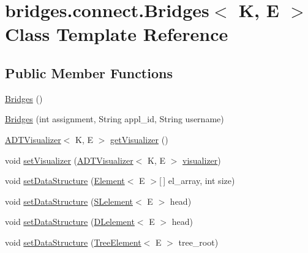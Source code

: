 \hypertarget{classbridges_1_1connect_1_1_bridges}{}\section{bridges.\+connect.\+Bridges$<$ K, E $>$ Class Template Reference}
\label{classbridges_1_1connect_1_1_bridges}
\subsection*{Public Member Functions}
\begin{DoxyCompactItemize}
\item 
\hyperlink{classbridges_1_1connect_1_1_bridges_a4925cf146eff9ff84e89351ab574795d}{Bridges} ()
\item 
\hyperlink{classbridges_1_1connect_1_1_bridges_a297e7ca95c725fa20bce0768c2d9aa64}{Bridges} (int assignment, String appl\+\_\+id, String username)
\item 
\hyperlink{classbridges_1_1base_1_1_a_d_t_visualizer}{A\+D\+T\+Visualizer}$<$ K, E $>$ \hyperlink{classbridges_1_1connect_1_1_bridges_a7193b48c9dc01b04dfcf0d66fa2f59fb}{get\+Visualizer} ()
\item 
void \hyperlink{classbridges_1_1connect_1_1_bridges_ad627f604914734646e92fac9e7b385d8}{set\+Visualizer} (\hyperlink{classbridges_1_1base_1_1_a_d_t_visualizer}{A\+D\+T\+Visualizer}$<$ K, E $>$ \hyperlink{classbridges_1_1connect_1_1_bridges_af3fc35779b31c976ed8bf2e173310502}{visualizer})
\item 
void \hyperlink{classbridges_1_1connect_1_1_bridges_a0cc12a419997a8ef0ef54afe9e65d1e9}{set\+Data\+Structure} (\hyperlink{classbridges_1_1base_1_1_element}{Element}$<$ E $>$\mbox{[}$\,$\mbox{]} el\+\_\+array, int size)
\item 
void \hyperlink{classbridges_1_1connect_1_1_bridges_ae41b3d86963350ace304d8951c1863ad}{set\+Data\+Structure} (\hyperlink{classbridges_1_1base_1_1_s_lelement}{S\+Lelement}$<$ E $>$ head)
\item 
void \hyperlink{classbridges_1_1connect_1_1_bridges_a383877f85bb048d47560e76f359e1bda}{set\+Data\+Structure} (\hyperlink{classbridges_1_1base_1_1_d_lelement}{D\+Lelement}$<$ E $>$ head)
\item 
void \hyperlink{classbridges_1_1connect_1_1_bridges_a0788905a16b9a8f3deb0b4a344f2b42d}{set\+Data\+Structure} (\hyperlink{classbridges_1_1base_1_1_tree_element}{Tree\+Element}$<$ E $>$ tree\+\_\+root)
\item 

\end{DoxyCompactItemize}
